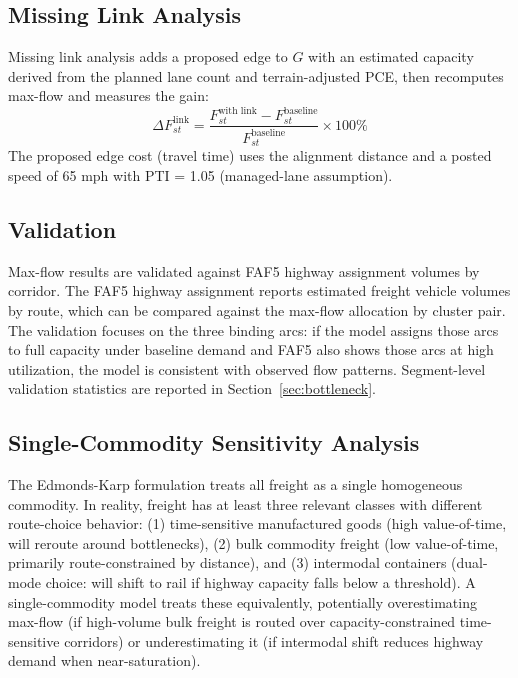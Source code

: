\subsection{Missing Link Analysis}

Missing link analysis adds a proposed edge to $G$ with an estimated capacity derived from the planned lane count and terrain-adjusted PCE, then recomputes max-flow and measures the gain:
\begin{equation}
  \Delta F_{st}^\text{link} = \frac{F_{st}^\text{with link} - F_{st}^\text{baseline}}{F_{st}^\text{baseline}} \times 100\%
\end{equation}
The proposed edge cost (travel time) uses the alignment distance and a posted speed of 65 mph with PTI = 1.05 (managed-lane assumption).

\subsection{Validation}

Max-flow results are validated against FAF5 highway assignment volumes by corridor. The FAF5 highway assignment reports estimated freight vehicle volumes by route, which can be compared against the max-flow allocation by cluster pair. The validation focuses on the three binding arcs: if the model assigns those arcs to full capacity under baseline demand and FAF5 also shows those arcs at high utilization, the model is consistent with observed flow patterns. Segment-level validation statistics are reported in Section~\ref{sec:bottleneck}.

\subsection{Single-Commodity Sensitivity Analysis}
\label{sec:sensitivity}

The Edmonds-Karp formulation treats all freight as a single homogeneous commodity. In
reality, freight has at least three relevant classes with different route-choice behavior:
(1) time-sensitive manufactured goods (high value-of-time, will reroute around bottlenecks),
(2) bulk commodity freight (low value-of-time, primarily route-constrained by distance),
and (3) intermodal containers (dual-mode choice: will shift to rail if highway capacity
falls below a threshold). A single-commodity model treats these equivalently, potentially
overestimating max-flow (if high-volume bulk freight is routed over capacity-constrained
time-sensitive corridors) or underestimating it (if intermodal shift reduces highway demand
when near-saturation).


